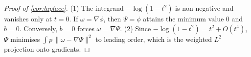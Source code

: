 \begin{proof}[Proof of \cref{cor:laplace}]
  (1) The integrand $-\log(1-t^2)$ is non-negative and vanishes only at
  $t=0$. If $\omega=\nabla\phi$, then $\Psi=\phi$ attains the minimum
  value $0$ and $b=0$. Conversely, $b=0$ forces $\omega=\nabla\Psi$.
  (2) Since $-\log(1-t^2)=t^2+O(t^4)$, $\Psi$ minimises
  $\int p\,\|\omega-\nabla\Psi\|^2$ to leading order, which is the weighted
  $L^2$ projection onto gradients.
\end{proof}
